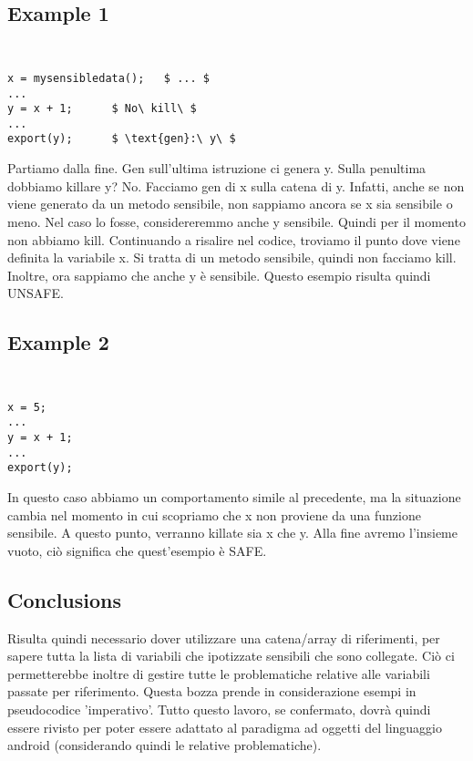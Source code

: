 \documentclass[letterpaper,twocolumn,10pt]{article}
\begin{document}
\subsection{Example 1}
{\tt \small
\begin{verbatim}
x = mysensibledata();	$ ... $		
...
y = x + 1;		$ No\ kill\ $
...	
export(y);		$ \text{gen}:\ y\ $
\end{verbatim}
}

Partiamo dalla fine. Gen sull'ultima istruzione ci genera y. Sulla penultima dobbiamo killare y? No. Facciamo gen di x sulla catena di y. Infatti, anche se non viene generato da un metodo sensibile, non sappiamo ancora se x sia sensibile o meno. Nel caso lo fosse, considereremmo anche y sensibile. Quindi per il momento non abbiamo kill. Continuando a risalire nel codice, troviamo il punto dove viene definita la variabile x. Si tratta di un metodo sensibile, quindi non facciamo kill. Inoltre, ora sappiamo che anche y \`e sensibile. Questo esempio risulta quindi UNSAFE.\\

\subsection{Example 2}
{\tt \small
\begin{verbatim}
x = 5;			
...
y = x + 1;	
...	
export(y);		
\end{verbatim}
}

In questo caso abbiamo un comportamento simile al precedente, ma la situazione cambia nel momento in cui scopriamo che x non proviene da una funzione sensibile. A questo punto, verranno killate sia x che y. Alla fine avremo l'insieme vuoto, ci\`o significa che quest'esempio \`e SAFE.\\

\subsection{Conclusions}
Risulta quindi necessario dover utilizzare una catena/array di riferimenti, per sapere tutta la lista di variabili che ipotizzate sensibili che sono collegate. Ci\`o ci permetterebbe inoltre di gestire tutte le problematiche relative alle variabili passate per riferimento.
Questa bozza prende in considerazione esempi in pseudocodice 'imperativo'. Tutto questo lavoro, se confermato, dovr\`a quindi essere rivisto per poter essere adattato al paradigma ad oggetti del linguaggio android (considerando quindi le relative problematiche). \\
\end{document}
